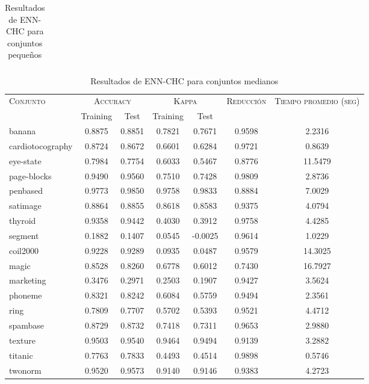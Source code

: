 \begin{table}[]
\begin{tabular}{l c c c c c c}
\hline
\end{tabular}
\caption{Resultados de ENN-CHC para conjuntos pequeños }
\label{res-peq-ENN-CHC}
\end{table}


\begin{table}[]
\centering
\begin{tabular}{l c c c c c c}
\hline
\multirow{2}{*}{\textsc{Conjunto}}
	& \multicolumn{2}{c}{\textsc{Accuracy}}
	& \multicolumn{2}{c}{\textsc{Kappa}}
	& \textsc{Reducción}
	& \textsc{Tiempo promedio (seg)} \\
	& Training & Test
	& Training & Test \\ 
\hline
\hline

banana & 0.8875 & 0.8851 & 0.7821 & 0.7671 & 0.9598 & 2.2316 \\
cardiotocography & 0.8724 & 0.8672 & 0.6601 & 0.6284 & 0.9721 & 0.8639 \\
eye-state & 0.7984 & 0.7754 & 0.6033 & 0.5467 & 0.8776 & 11.5479 \\
page-blocks & 0.9490 & 0.9560 & 0.7510 & 0.7428 & 0.9809 & 2.8736 \\
penbased & 0.9773 & 0.9850 & 0.9758 & 0.9833 & 0.8884 & 7.0029 \\
satimage & 0.8864 & 0.8855 & 0.8618 & 0.8583 & 0.9375 & 4.0794 \\
thyroid & 0.9358 & 0.9442 & 0.4030 & 0.3912 & 0.9758 & 4.4285 \\
segment & 0.1882 & 0.1407 & 0.0545 & -0.0025 & 0.9614 & 1.0229 \\
coil2000 & 0.9228 & 0.9289 & 0.0935 & 0.0487 & 0.9579 & 14.3025 \\
magic & 0.8528 & 0.8260 & 0.6778 & 0.6012 & 0.7430 & 16.7927 \\
marketing & 0.3476 & 0.2971 & 0.2503 & 0.1907 & 0.9427 & 3.5624 \\
phoneme & 0.8321 & 0.8242 & 0.6084 & 0.5759 & 0.9494 & 2.3561 \\
ring & 0.7809 & 0.7707 & 0.5702 & 0.5393 & 0.9521 & 4.4712 \\
spambase & 0.8729 & 0.8732 & 0.7418 & 0.7311 & 0.9653 & 2.9880 \\
texture & 0.9503 & 0.9540 & 0.9464 & 0.9494 & 0.9139 & 3.2882 \\
titanic & 0.7763 & 0.7833 & 0.4493 & 0.4514 & 0.9898 & 0.5746 \\
twonorm & 0.9520 & 0.9573 & 0.9140 & 0.9146 & 0.9383 & 4.2723 \\

\hline
\end{tabular}
\caption{Resultados de ENN-CHC para conjuntos medianos }
\label{res-med-ENN-CHC}
\end{table}


